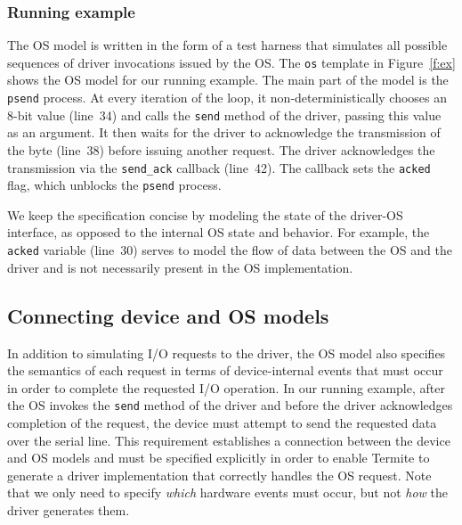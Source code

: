 \documentclass[a4paper,twoside,openright,11pt]{book}
\newcommand{\termite}{Termite\xspace}
\theoremstyle{definition}
\newcommand{\src}[1]{\texttt{\small #1}}
\begin{document}
\subsubsection{Running example}

The OS model is written in the form of a test harness that simulates all possible sequences of driver invocations issued by the OS.  The \src{os} template in Figure~\ref{f:ex} shows the OS model for our running example.  The main part of the model is the \src{psend} process.  At every iteration of the loop, it non-deterministically chooses an 8-bit value (line~34) and calls the \src{send} method of the driver, passing this value as an argument.  It then waits for the driver to acknowledge the transmission of the byte (line~38) before issuing another request.  The driver acknowledges the transmission via the \src{send\_ack} callback (line~42).  The callback sets the \src{acked} flag, which unblocks the \src{psend} process.

We keep the specification concise by modeling the state of the driver-OS interface, as opposed to the internal OS state and behavior.  For example, the \src{acked} variable (line~30) serves to model the flow of data between the OS and the driver and is not necessarily present in the OS implementation.


\subsection{Connecting device and OS models}\label{s:virt}

In addition to simulating I/O requests to the driver, the OS model also specifies the semantics of each request in terms of device-internal events that must occur in order to complete the requested I/O operation.  In our running example, after the OS invokes the \src{send} method of the driver and before the driver acknowledges completion of the request, the device must attempt to send the requested data over the serial line.  This requirement establishes a connection between the device and OS models and must be specified explicitly in order to enable \termite to generate a driver implementation that correctly handles the OS request.  Note that we only need to specify \emph{which} hardware events must occur, but not \emph{how} the driver generates them.
\end{document}
